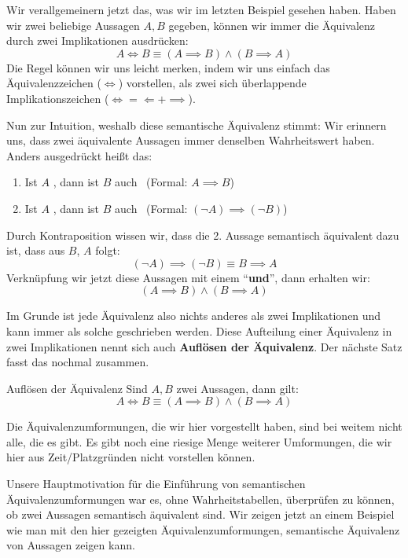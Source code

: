 \documentclass[../../main.tex]{subfiles}
\newcommand{\statement}[1]{\textrm{\enquote{\textbf{#1}}}}
\def\wahr{\text{\color{green!50!black}wahr}}
\def\falsch{\text{\color{red!80!black}falsch}}
\begin{document}
    Wir verallgemeinern jetzt das, was wir im letzten Beispiel gesehen haben.
     Haben wir zwei beliebige Aussagen $A,B$ gegeben, können wir immer die Äquivalenz
     durch zwei Implikationen ausdrücken:
    \[A \iff B \equiv (A \implies B) \land (B \implies A)\]
    Die Regel können wir uns leicht merken, indem wir uns einfach das Äquivalenzzeichen
    ($\iff$) vorstellen, als zwei sich überlappende Implikationszeichen ($\iff = \Longleftarrow + \implies$).

    Nun zur Intuition, weshalb diese semantische Äquivalenz stimmt: Wir erinnern uns, dass zwei äquivalente Aussagen 
    immer denselben Wahrheitswert haben. Anders ausgedrückt heißt das:
    \begin{enumerate}
        \item Ist $A$ \wahr, dann ist $B$ auch \wahr\  (Formal: $A \implies B$)
        \item Ist $A$ \falsch, dann ist $B$ auch \falsch\  (Formal: $(\lnot A) \implies (\lnot B)$)
    \end{enumerate}
    Durch Kontraposition wissen wir, dass die 2. Aussage semantisch äquivalent dazu ist,
    dass aus $B$, $A$ folgt:
    \[(\lnot A) \implies (\lnot B) \equiv B \implies A\]
    Verknüpfung wir jetzt diese Aussagen mit einem \statement{und}, dann erhalten wir:
    \[(A \implies B) \land (B \implies A)\]
    
    Im Grunde ist jede Äquivalenz also nichts anderes als zwei Implikationen und kann immer als solche geschrieben werden. 
    Diese Aufteilung einer Äquivalenz in zwei Implikationen nennt sich auch \textbf{Auflösen der Äquivalenz}.
    Der nächste Satz fasst das nochmal zusammen.
    
    \begin{lemma}{Auflösen der Äquivalenz}
    Sind $A,B$ zwei Aussagen, dann gilt:
        \[ A \iff B \equiv (A \implies B) \land (B \implies A)\]
    \end{lemma}

    Die Äquivalenzumformungen, die wir hier vorgestellt haben, sind bei weitem nicht alle, die es gibt. Es gibt
    noch eine riesige Menge weiterer Umformungen, die wir hier aus Zeit/Platzgründen nicht vorstellen können.
    
    Unsere Hauptmotivation für die Einführung von semantischen Äquivalenzumformungen war es, ohne
    Wahrheitstabellen, überprüfen zu können, ob zwei Aussagen semantisch äquivalent sind. 
    Wir zeigen jetzt an einem Beispiel wie man mit den hier gezeigten Äquivalenzumformungen, semantische Äquivalenz von 
    Aussagen zeigen kann.
\end{document}
